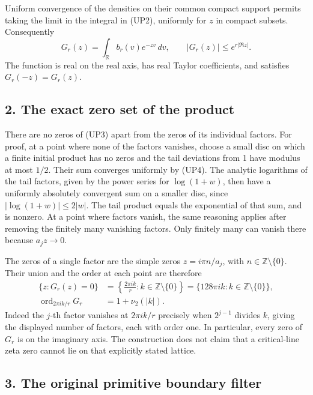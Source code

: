 \documentclass[
  10pt,
  a4paper,
]{article}
\begin{document}
Uniform convergence of the densities on their common compact support
permits taking the limit in the integral in (UP2), uniformly for \(z\)
in compact subsets. Consequently \[
G_r(z)=\int_{\mathbb R}b_r(v)e^{-zv}\,dv,
\qquad |G_r(z)|\le e^{r|\Re z|}.
\tag{UP10}
\] The function is real on the real axis, has real Taylor coefficients,
and satisfies \(G_r(-z)=G_r(z)\).

\subsection{2. The exact zero set of the
product}\label{the-exact-zero-set-of-the-product}

There are no zeros of (UP3) apart from the zeros of its individual
factors. For proof, at a point where none of the factors vanishes,
choose a small disc on which a finite initial product has no zeros and
the tail deviations from 1 have modulus at most \(1/2\). Their sum
converges uniformly by (UP4). The analytic logarithms of the tail
factors, given by the power series for \(\log(1+w)\), then have a
uniformly absolutely convergent sum on a smaller disc, since
\(|\log(1+w)|\le2|w|\). The tail product equals the exponential of that
sum, and is nonzero. At a point where factors vanish, the same reasoning
applies after removing the finitely many vanishing factors. Only
finitely many can vanish there because \(a_jz\to0\).

The zeros of a single factor are the simple zeros \(z=i\pi n/a_j\), with
\(n\in\mathbb Z\setminus\{0\}\). Their union and the order at each point
are therefore \[
\begin{aligned}
\{z:G_r(z)=0\}
&=\left\{\frac{2\pi i k}{r}:k\in\mathbb Z\setminus\{0\}\right\}
=\{128\pi i k:k\in\mathbb Z\setminus\{0\}\},\\
\operatorname{ord}_{2\pi i k/r}G_r&=1+\nu_2(|k|).
\end{aligned}
\tag{UP11}
\] Indeed the \(j\)-th factor vanishes at \(2\pi i k/r\) precisely when
\(2^{j-1}\) divides \(k\), giving the displayed number of factors, each
with order one. In particular, every zero of \(G_r\) is on the imaginary
axis. The construction does not claim that a critical-line zeta zero
cannot lie on that explicitly stated lattice.

\subsection{3. The original primitive boundary
filter}\label{the-original-primitive-boundary-filter}
\end{document}
